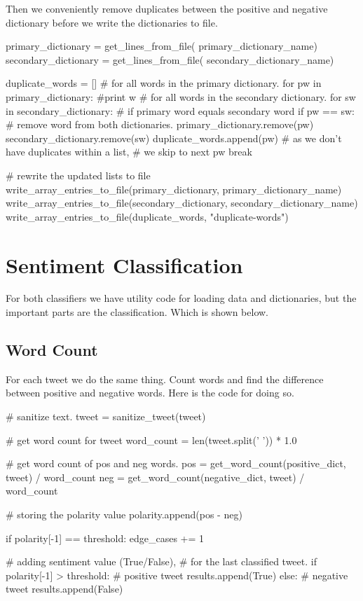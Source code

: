 Then we conveniently remove duplicates between the positive and negative
dictionary before we write the dictionaries to file. 
\begin{python}
primary_dictionary = get_lines_from_file(
    primary_dictionary_name)
secondary_dictionary = get_lines_from_file(
    secondary_dictionary_name)

duplicate_words = []
# for all words in the primary dictionary.
for pw in primary_dictionary:
    #print w
    # for all words in the secondary dictionary.
    for sw in secondary_dictionary:
        # if primary word equals secondary word
        if pw == sw:
            # remove word from both dictionaries.
            primary_dictionary.remove(pw)
            secondary_dictionary.remove(sw)
            duplicate_words.append(pw)
            # as we don't have duplicates within a list,
            # we skip to next pw
            break

# rewrite the updated lists to file
write_array_entries_to_file(primary_dictionary, 
                            primary_dictionary_name)
write_array_entries_to_file(secondary_dictionary, 
                            secondary_dictionary_name)
write_array_entries_to_file(duplicate_words, 
                            "duplicate-words")
\end{python}
%

\section{Sentiment Classification}\label{code:sentiment_classification}
For both classifiers we have utility code for loading data and dictionaries,
but the important parts are the classification. Which is shown below. 

\subsection{Word Count}
For each tweet we do the same thing. Count words and find the difference
between positive and negative words. Here is the code for doing so.   
\begin{python}
# sanitize text.
tweet = sanitize_tweet(tweet)

# get word count for tweet
word_count = len(tweet.split(' ')) * 1.0

# get word count of pos and neg words.
pos = get_word_count(positive_dict, tweet) / word_count
neg = get_word_count(negative_dict, tweet) / word_count

# storing the polarity value
polarity.append(pos - neg)

if polarity[-1] == threshold:
    edge_cases += 1

# adding sentiment value (True/False), 
# for the last classified tweet.
if polarity[-1] > threshold:
    # positive tweet
    results.append(True)
else:
    # negative tweet
    results.append(False)
\end{python}


